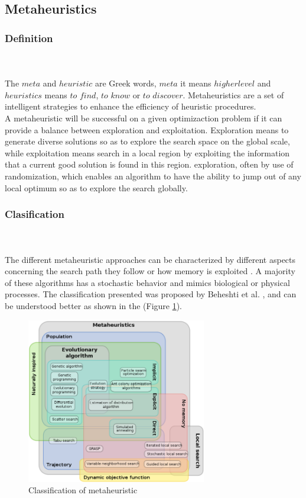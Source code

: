 \subsection{Metaheuristics}

\subsubsection{Definition}
~\\
~\\
The $meta$ and $heuristic$ are Greek words, $meta$ it means $higher level$ and $heuristics$ means $to$ $find$, $to$ $know$ or $to$ $discover$. Metaheuristics are a set of intelligent strategies to enhance the efficiency of heuristic procedures.\\
A metaheuristic will be successful on a given optimizaction problem if it can provide a balance between exploration and exploitation. Exploration means to generate diverse solutions so as to explore the search space on the global scale, while exploitation means search in a local region by exploiting the information that a current good solution is found in this region.
exploration, often by use of randomization, which enables an algorithm to have the ability to jump out of any local optimum so as to explore the search globally.

\subsubsection{Clasification}
~\\
~\\
The different metaheuristic approaches can be characterized by different aspects concerning the search path they follow or how memory is exploited \cite{citeulike:1859945}. A majority of these algorithms has a stochastic behavior and mimics biological or  physical processes. The classification presented was proposed by Beheshti et al. \cite{Beheshti:2014:CCA:2563733.2564085}, and can be understood better as shown in the (Figure \ref{fig:classification-of-mh}).

\squeezeup
\begin{figure}[ht]
	\centering
  \includegraphics[width=0.70\textwidth]{MarcoTeorico/imagenes/classification_mh.png}
	\caption{Classification of metaheuristic}\label{fig:classification-of-mh}
\end{figure}
\squeezeup


